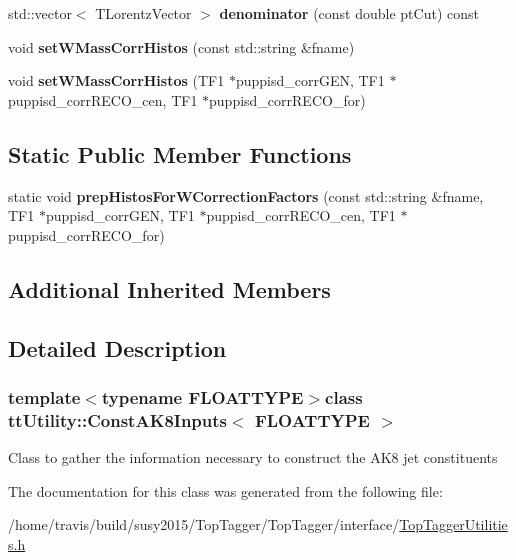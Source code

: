 \begin{DoxyCompactItemize}
\item 
\hypertarget{classttUtility_1_1ConstAK8Inputs_ab30438c09182769fba7c12d506a677a3}{std\-::vector$<$ T\-Lorentz\-Vector $>$ {\bfseries denominator} (const double pt\-Cut) const }\label{classttUtility_1_1ConstAK8Inputs_ab30438c09182769fba7c12d506a677a3}

\item 
\hypertarget{classttUtility_1_1ConstAK8Inputs_a5734dc3413d1131ded1fcd3e7d29fcd1}{void {\bfseries set\-W\-Mass\-Corr\-Histos} (const std\-::string \&fname)}\label{classttUtility_1_1ConstAK8Inputs_a5734dc3413d1131ded1fcd3e7d29fcd1}

\item 
\hypertarget{classttUtility_1_1ConstAK8Inputs_a4409e140d025cf8f277934975715d512}{void {\bfseries set\-W\-Mass\-Corr\-Histos} (T\-F1 $\ast$puppisd\-\_\-corr\-G\-E\-N, T\-F1 $\ast$puppisd\-\_\-corr\-R\-E\-C\-O\-\_\-cen, T\-F1 $\ast$puppisd\-\_\-corr\-R\-E\-C\-O\-\_\-for)}\label{classttUtility_1_1ConstAK8Inputs_a4409e140d025cf8f277934975715d512}

\end{DoxyCompactItemize}
\subsection*{Static Public Member Functions}
\begin{DoxyCompactItemize}
\item 
\hypertarget{classttUtility_1_1ConstAK8Inputs_aa693665ad5ea4399205db48ca5156ac8}{static void {\bfseries prep\-Histos\-For\-W\-Correction\-Factors} (const std\-::string \&fname, T\-F1 $\ast$puppisd\-\_\-corr\-G\-E\-N, T\-F1 $\ast$puppisd\-\_\-corr\-R\-E\-C\-O\-\_\-cen, T\-F1 $\ast$puppisd\-\_\-corr\-R\-E\-C\-O\-\_\-for)}\label{classttUtility_1_1ConstAK8Inputs_aa693665ad5ea4399205db48ca5156ac8}

\end{DoxyCompactItemize}
\subsection*{Additional Inherited Members}


\subsection{Detailed Description}
\subsubsection*{template$<$typename F\-L\-O\-A\-T\-T\-Y\-P\-E$>$class tt\-Utility\-::\-Const\-A\-K8\-Inputs$<$ F\-L\-O\-A\-T\-T\-Y\-P\-E $>$}

Class to gather the information necessary to construct the A\-K8 jet constituents 

The documentation for this class was generated from the following file\-:\begin{DoxyCompactItemize}
\item 
/home/travis/build/susy2015/\-Top\-Tagger/\-Top\-Tagger/interface/\hyperlink{TopTaggerUtilities_8h}{Top\-Tagger\-Utilities.\-h}\end{DoxyCompactItemize}
